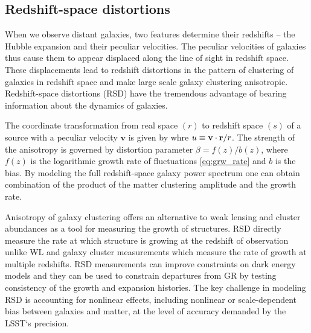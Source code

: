 \subsection{Redshift-space distortions}
\label{sec:rsd}
When we observe distant galaxies, two features determine their redshifts -- the Hubble expansion and their peculiar velocities. The peculiar velocities of galaxies thus cause them to appear displaced along the line of sight in redshift space. These displacements lead to redshift distortions in the pattern of clustering of galaxies in redshift space and make large scale galaxy clustering anisotropic. Redshift-space distortions (RSD) have the tremendous advantage of bearing information about the dynamics of galaxies.

The coordinate transformation from real space $(r)$ to redshift space $(s)$ of a source with a peculiar velocity $\bm v$ is given by
whre $u\equiv\mathbf v\cdot\mathbf r/r$. The strength of the anisotropy is governed by distortion parameter $\beta = f(z)/b(z)$, where $f(z)$ is the logarithmic growth rate of fluctuations \eqref{eq:grw_rate} and $b$ is the bias. By modeling the full redshift-space galaxy power spectrum one can obtain combination of the product of the matter clustering amplitude and the growth rate.

Anisotropy of galaxy clustering offers an alternative to weak lensing and cluster abundances as a tool for measuring the growth of structures. RSD directly measure the rate at which structure is growing at the redshift of observation unlike WL and galaxy cluster measurements  which measure the rate of growth at multiple redshifts. RSD measurements can improve constraints on dark energy models and they can be used to constrain departures from GR by testing consistency of the growth and expansion histories. The key challenge in modeling RSD is accounting for nonlinear effects, including nonlinear or scale-dependent bias between galaxies and matter, at the level of accuracy demanded by the LSST`s precision.